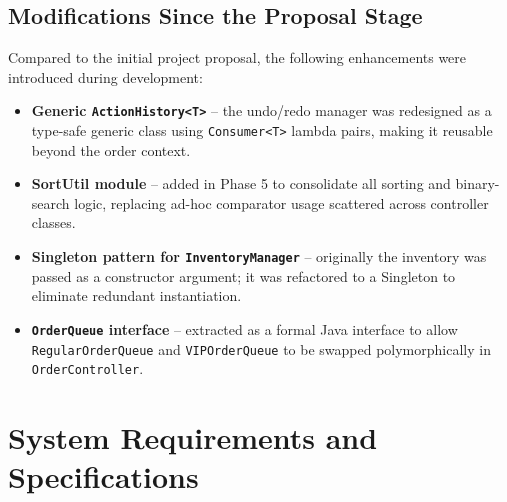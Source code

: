 \documentclass[11pt,a4paper]{article}
\begin{document}
\subsection{Modifications Since the Proposal Stage}
Compared to the initial project proposal, the following enhancements were introduced during development:
\begin{itemize}[leftmargin=*]
    \item \textbf{Generic \texttt{ActionHistory<T>}} -- the undo/redo manager was redesigned as a type-safe generic class using \texttt{Consumer<T>} lambda pairs, making it reusable beyond the order context.
    \item \textbf{SortUtil module} -- added in Phase 5 to consolidate all sorting and binary-search logic, replacing ad-hoc comparator usage scattered across controller classes.
    \item \textbf{Singleton pattern for \texttt{InventoryManager}} -- originally the inventory was passed as a constructor argument; it was refactored to a Singleton to eliminate redundant instantiation.
    \item \textbf{\texttt{OrderQueue} interface} -- extracted as a formal Java interface to allow \texttt{RegularOrderQueue} and \texttt{VIPOrderQueue} to be swapped polymorphically in \texttt{OrderController}.
\end{itemize}

\newpage

\section{System Requirements and Specifications}
\end{document}
